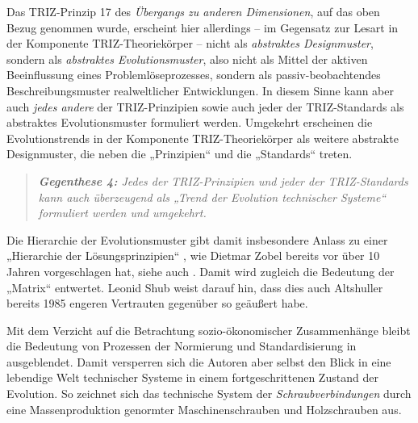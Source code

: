 \documentclass[11pt,a4paper]{article}
\begin{document}
Das TRIZ-Prinzip 17 des \emph{Übergangs zu anderen Dimensionen}, auf das oben
Bezug genommen wurde, erscheint hier allerdings -- im Gegensatz zur Lesart in
der Komponente TRIZ-Theoriekörper -- nicht als \emph{abstraktes Designmuster},
sondern als \emph{abstraktes Evolutionsmuster}, also nicht als Mittel der
aktiven Beeinflussung eines Problemlöseprozesses, sondern als
passiv-beobachtendes Beschreibungsmuster realweltlicher Entwicklungen.  In
diesem Sinne kann aber auch \emph{jedes andere} der TRIZ-Prinzipien sowie auch
jeder der TRIZ-Standards als abstraktes Evolutionsmuster formuliert
werden. Umgekehrt erscheinen die Evolutionstrends in der Komponente
TRIZ-Theoriekörper als weitere abstrakte Designmuster, die neben die
„Prinzipien“ und die „Standards“ treten.
\begin{quote}\it
  \textbf{Gegenthese 4:} Jedes der TRIZ-Prinzipien und jeder der
  TRIZ-Standards kann auch überzeugend als „Trend der Evolution technischer
  Systeme“ formuliert werden und umgekehrt. 
\end{quote}
Die Hierarchie der Evolutionsmuster gibt damit insbesondere Anlass zu einer
„Hierarchie der Lösungsprinzipien“ \cite[Kap. 3]{Zobel2016}, wie Dietmar Zobel
bereits vor über 10 Jahren vorgeschlagen hat, siehe auch \cite{Zobel2020}.
Damit wird zugleich die Bedeutung der „Matrix“ entwertet. Leonid Shub
\cite{Shub2006} weist darauf hin, dass dies auch Altshuller bereits 1985
engeren Vertrauten gegenüber so geäußert habe.

Mit dem Verzicht auf die Betrachtung sozio-ökonomischer Zusammenhänge bleibt
die Bedeutung von Prozessen der Normierung und Standardisierung in
\cite{TESE2018} ausgeblendet. Damit versperren sich die Autoren aber selbst
den Blick in eine lebendige Welt technischer Systeme in einem
fortgeschrittenen Zustand der Evolution. So zeichnet sich das technische
System der \emph{Schraubverbindungen} durch eine Massenproduktion genormter
Maschinenschrauben und Holzschrauben aus.
\end{document}
